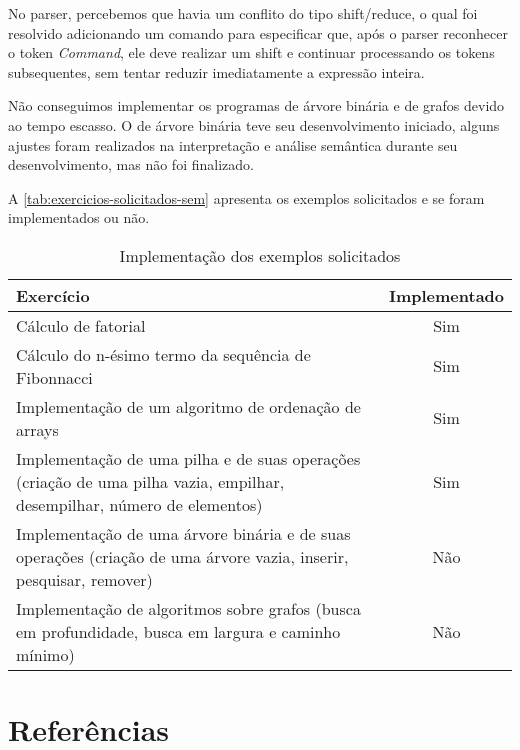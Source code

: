 \documentclass{article}
\begin{document}
No parser, percebemos que havia um conflito do tipo shift/reduce, o qual foi resolvido adicionando um comando para especificar que, após o parser reconhecer o token \textit{Command}, ele deve realizar um shift e continuar processando os tokens subsequentes, sem tentar reduzir imediatamente a expressão inteira.

Não conseguimos implementar os programas de árvore binária e de grafos devido ao tempo escasso. O de árvore binária teve seu desenvolvimento iniciado, alguns ajustes foram realizados na interpretação e análise semântica durante seu desenvolvimento, mas não foi finalizado. 

A \autoref{tab:exercicios-solicitados-sem} apresenta os exemplos solicitados e se foram implementados ou não.

\begin{table}[h!]
\centering
\caption{Implementação dos exemplos solicitados}
\label{tab:exercicios-solicitados-sem}
\begin{tabular}{p{5cm}c}
\hline
\textbf{Exercício} & \textbf{Implementado} \\ \hline
Cálculo de fatorial & Sim \\ \hline
Cálculo do n-ésimo termo da sequência de Fibonnacci & Sim \\ \hline
Implementação de um algoritmo de ordenação de arrays & Sim \\ \hline
Implementação de uma pilha e de suas operações (criação de uma pilha vazia, empilhar, desempilhar, número de elementos) & Sim \\ \hline
Implementação de uma árvore binária e de suas operações (criação de uma árvore vazia, inserir, pesquisar, remover) & Não \\ \hline
Implementação de algoritmos sobre grafos (busca em profundidade, busca em largura e caminho mínimo) & Não \\ \hline
\end{tabular}
\end{table}

\section{Referências}

\printbibliography

\newpage
\end{document}
